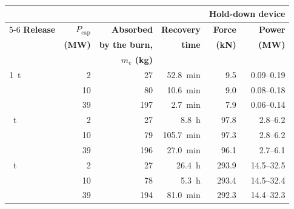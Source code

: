 \begin{tabular}{@{} l r r r r r @{}}
\toprule
 & & & & \multicolumn{2}{c}{\textbf{Hold-down device}} \\
\cmidrule(l){5-6}
\textbf{Release} & \textbf{$P_\text{cap}$} & \textbf{Absorbed} & \textbf{Recovery} & \textbf{Force} & \textbf{Power} \\
 & \textbf{(MW)} & \textbf{by the burn,} & \textbf{time} & \textbf{(kN)} & \textbf{(MW)} \\
 & & \textbf{$m_e$ (kg)} & & & \\
\midrule
1~t & 2 & 27 & 52.8~min & 9.5 & 0.09--0.19 \\
 & 10 & 80 & 10.6~min & 9.0 & 0.08--0.18 \\
 & 39 & 197 & 2.7~min & 7.9 & 0.06--0.14 \\
\addlinespace
10~t & 2 & 27 & 8.8~h & 97.8 & 2.8--6.2 \\
 & 10 & 79 & 105.7~min & 97.3 & 2.8--6.2 \\
 & 39 & 196 & 27.0~min & 96.1 & 2.7--6.1 \\
\addlinespace
30~t & 2 & 27 & 26.4~h & 293.9 & 14.5--32.5 \\
 & 10 & 78 & 5.3~h & 293.4 & 14.5--32.4 \\
 & 39 & 194 & 81.0~min & 292.3 & 14.4--32.3 \\
\bottomrule
\end{tabular}

